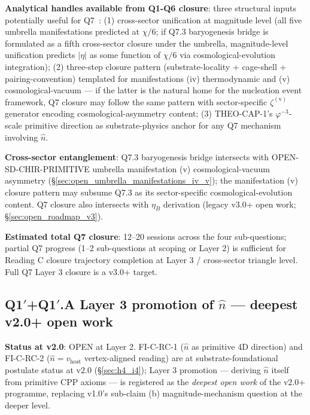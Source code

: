 \documentclass[11pt,letterpaper]{article}
\newcommand{\phig}{\varphi}
\begin{document}
\textbf{Analytical handles available from Q1-Q6 closure}: three structural inputs potentially useful for Q7~\cite{abshier_capotauro_chiral_mechanism_sketch}: (1) cross-sector unification at magnitude level (all five umbrella manifestations predicted at $\chi/6$; if Q7.3 baryogenesis bridge is formulated as a fifth cross-sector closure under the umbrella, magnitude-level unification predicts $|\eta|$ as some function of $\chi/6$ via cosmological-evolution integration); (2) three-step closure pattern (substrate-locality + cage-shell + pairing-convention) templated for manifestations (iv) thermodynamic and (v) cosmological-vacuum --- if the latter is the natural home for the nucleation event framework, Q7 closure may follow the same pattern with sector-specific $\zeta^{(\text{v})}$ generator encoding cosmological-asymmetry content; (3) THEO-CAP-1's $\phig^{-3}$-scale primitive direction as substrate-physics anchor for any Q7 mechanism involving $\hat{n}$.

\textbf{Cross-sector entanglement}: Q7.3 baryogenesis bridge intersects with OPEN-SD-CHIR-PRIMITIVE umbrella manifestation (v) cosmological-vacuum asymmetry (\S\ref{sec:open_umbrella_manifestations_iv_v}); the manifestation (v) closure pattern may subsume Q7.3 as its sector-specific cosmological-evolution content. Q7 closure also intersects with $\eta_B$ derivation (legacy v3.0+ open work; \S\ref{sec:open_roadmap_v3}).

\textbf{Estimated total Q7 closure}: 12--20 sessions across the four sub-questions; partial Q7 progress (1--2 sub-questions at scoping or Layer 2) is sufficient for Reading C closure trajectory completion at Layer 3 / cross-sector triangle level. Full Q7 Layer 3 closure is a v3.0+ target.

\subsection{Q1$'$+Q1$'$.A Layer 3 promotion of $\hat{n}$ --- deepest v2.0+ open work}\label{sec:open_n_hat_layer3}

\textbf{Status at v2.0}: OPEN at Layer 2. FI-C-RC-1 ($\hat{n}$ as primitive 4D direction) and FI-C-RC-2 ($\hat{n} = v_{\text{host}}$ vertex-aligned reading) are at substrate-foundational postulate status at v2.0 (\S\ref{sec:h4_i4}); Layer 3 promotion --- deriving $\hat{n}$ itself from primitive CPP axioms --- is registered as the \emph{deepest open work} of the v2.0+ programme, replacing v1.0's sub-claim (b) magnitude-mechanism question at the deeper level.
\end{document}
